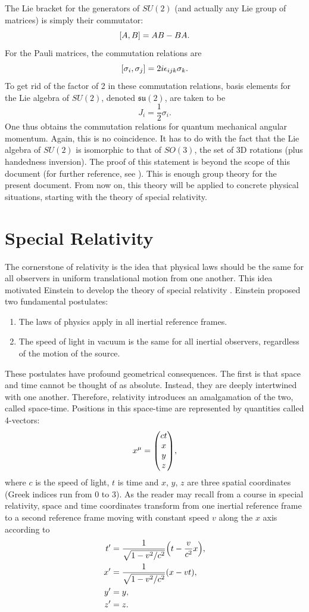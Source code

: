 The Lie bracket for the generators of $SU(2)$ (and actually any Lie group of matrices) is simply their commutator: $$\comm{A}{B} = AB-BA.$$ For the Pauli matrices, the commutation relations are $$\comm{\sigma_i}{\sigma_j} = 2i\epsilon_{ijk}\sigma_k.$$ To get rid of the factor of 2 in these commutation relations, basis elements for the Lie algebra of $SU(2)$, denoted $\mathfrak{su}(2)$, are taken to be $$J_i = \frac{1}{2}\sigma_i.$$ One thus obtains the commutation relations for quantum mechanical angular momentum. Again, this is no coincidence. It has to do with the fact that the Lie algebra of $SU(2)$ is isomorphic to that of $SO(3)$, the set of 3D rotations (plus handedness inversion). The proof of this statement is beyond the scope of this document (for further reference, see \cite{schwichtenberg_physics_2017}). This is enough group theory for the present document. From now on, this theory will be applied to concrete physical situations, starting with the theory of special relativity.

\section{Special Relativity}
The cornerstone of relativity is the idea that physical laws should be the same for all observers in uniform translational motion from one another. This idea motivated Einstein to develop the theory of special relativity \cite{griffiths_introduction_2018}. Einstein proposed two fundamental postulates:
\begin{enumerate}
    \item The laws of physics apply in all inertial reference frames.
    \item The speed of light in vacuum is the same for all inertial observers, regardless of the motion of the source.
\end{enumerate}

These postulates have profound geometrical consequences. The first is that space and time cannot be thought of as absolute. Instead, they are deeply intertwined with one another. Therefore, relativity introduces an amalgamation of the two, called space-time. Positions in this space-time are represented by quantities called 4-vectors: $$x^\mu = \mqty( ct \\ x \\ y \\ z),$$ where $c$ is the speed of light, $t$ is time and $x$, $y$, $z$ are three spatial coordinates (Greek indices run from 0 to 3). As the reader may recall from a course in special relativity, space and time coordinates transform from one inertial reference frame to a second reference frame moving with constant speed $v$ along the $x$ axis according to
\begin{align}
    t' &= \frac{1}{\sqrt{1-v^2/c^2}}\qty(t-\frac{v}{c^2}x), \label{eq:Lorentz_transfo_t}\\
    x' &= \frac{1}{\sqrt{1-v^2/c^2}}(x-vt), \label{eq:Lorentz_transfo_x}\\
    y' &= y, \label{eq:Lorentz_transfo_y}\\
    z' &= z. \label{eq:Lorentz_transfo_z}
\end{align}

